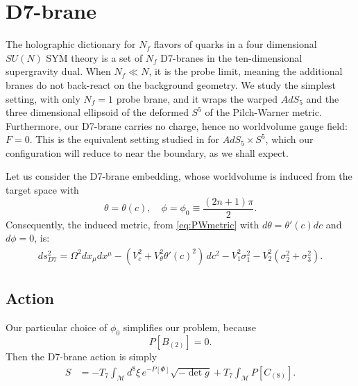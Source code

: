 \section{D7-brane}\label{sec:D7brane}

The holographic dictionary for $N_f$ flavors of quarks in a four dimensional $SU(N)$ SYM theory is a set of $N_f$ D7-branes in the ten-dimensional supergravity dual. When $N_f \ll N$, it is the probe limit, meaning the additional branes do not back-react on the background geometry. 
We study the simplest setting, with only $N_f=1$ probe brane, and it wraps the warped $AdS_5$ and the three dimensional ellipsoid of the deformed $S^5$ of the Pilch-Warner metric. Furthermore, our D7-brane carries no charge, hence no worldvolume gauge field: $F = 0$. This is the equivalent setting studied in \cite{Karch:2002sh} for $AdS_5 \times S^5$, which our configuration will reduce to near the boundary, as we shall expect.


Let us consider the D7-brane embedding, whose worldvolume is induced from the target space with 
\begin{equation}\label{eq:ansatz}
 \theta = \theta(c), \quad \phi=\phi_0\equiv\frac{(2 n + 1)\pi}{2}.
\end{equation}
Consequently, the induced metric, from \eqref{eq:PWmetric} with $d\theta = \theta'(c) dc$ and $d\phi=0$, is:
\begin{align}\label{eq:PWmetric}
ds_{D7}^2 =
\Omega^2 dx_\mu dx^\mu 
- (V_c^2 +V_\theta^2 \theta'(c)^2)\, dc^2 - V_1^2 \sigma_1^2 - V_2^2 (\sigma_2^2 + \sigma_3^2).
\end{align}


\subsection{Action}

Our particular choice of $\phi_0$ simplifies our problem, because
\begin{equation}
 P[B_{(2)}] = 0.
\end{equation}
Then the D7-brane action is simply
\begin{align}
 S & = -T_7 \int_\mathcal{M} d^8\xi \, e^{-P[\Phi] } \sqrt{-\det g} +
 T_7\int _\mathcal{M} P[C_{(8)}].
\end{align}



